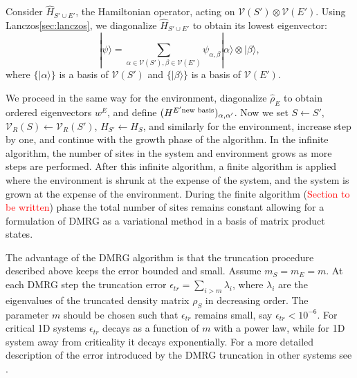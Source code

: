 \documentclass[paper=letter]{scrartcl}
\newcommand{\todo}[1]{\textcolor{red}{#1}}
\begin{document}
Consider $\hat{H}_{S'\cup E'}$, the Hamiltonian operator, acting on $\mathcal{V}(S')\otimes\mathcal{V}(E')$. Using Lanczos\ref{sec:lanczos}, we diagonalize $\hat{H}_{S'\cup E'}$ to obtain its lowest eigenvector: \begin{equation} |\psi\rangle = \sum_{\alpha\in \mathcal{V}(S'), \beta\in\mathcal{V}(E')}\psi_{\alpha,\beta}|\alpha\rangle\otimes|\beta\rangle, \label{eq:psi} \end{equation} where $\{|\alpha\rangle\}$ is a basis of $\mathcal{V}(S')$ and $\{|\beta\rangle\}$ is a basis of $\mathcal{V}(E')$.

We proceed in the same way for the environment, diagonalize $\hat{\rho}_E$ to obtain ordered eigenvectors $w^E$, and define $(H^{ E' {\rm new\,\,basis}})_{\alpha,\alpha'}$. Now we set $S\leftarrow S'$, $\mathcal{V}_R(S)\leftarrow\mathcal{V}_R(S')$, $H_{S'}\leftarrow H_{S}$, and similarly for the environment, increase step by one, and continue with the growth phase of the algorithm.
In the infinite algorithm, the number of sites in the system and environment grows as more steps are performed. After this infinite algorithm, a finite algorithm is applied where the environment is shrunk at the expense of the system, and the system is grown at the expense of the environment. During the finite algorithm (\todo{Section to be written}) phase the total number of sites remains constant allowing for a formulation of DMRG as a variational method in a basis of matrix product states.

The advantage of the DMRG algorithm is that the truncation procedure described above keeps the error bounded and small.
Assume $m_S=m_E=m$.
At each DMRG step\cite{re:dechiara08} the truncation error $\epsilon_{tr}=\sum_{i>m} \lambda_i$, where $\lambda_i$ are the eigenvalues of the
truncated density matrix $\rho_S$ in decreasing order. The parameter $m$ should be chosen such that $\epsilon_{tr}$ remains small, say \cite{re:dechiara08}
$\epsilon_{tr}<10^{-6}$. For critical 1D systems $\epsilon_{tr}$ decays as a function of $m$ with a  power law, while for 1D system
away from criticality it decays exponentially. For a more detailed description of the error introduced by the DMRG truncation in other
systems see \cite{re:dechiara08,re:schollwock05,re:hallberg06,re:rodriguez02}.
\end{document}
